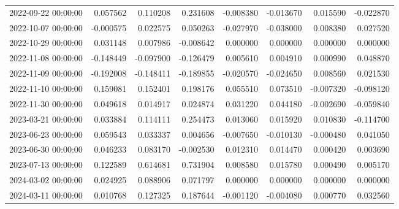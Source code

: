 \begin{tabular}{lrrrrrrr}
2022-09-22 00:00:00 & 0.057562 & 0.110208 & 0.231608 & -0.008380 & -0.013670 & 0.015590 & -0.022870 \\
2022-10-07 00:00:00 & -0.000575 & 0.022575 & 0.050263 & -0.027970 & -0.038000 & 0.008380 & 0.027520 \\
2022-10-29 00:00:00 & 0.031148 & 0.007986 & -0.008642 & 0.000000 & 0.000000 & 0.000000 & 0.000000 \\
2022-11-08 00:00:00 & -0.148449 & -0.097900 & -0.126479 & 0.005610 & 0.004910 & 0.000990 & 0.048870 \\
2022-11-09 00:00:00 & -0.192008 & -0.148411 & -0.189855 & -0.020570 & -0.024650 & 0.008560 & 0.021530 \\
2022-11-10 00:00:00 & 0.159081 & 0.152401 & 0.198176 & 0.055510 & 0.073510 & -0.007320 & -0.098120 \\
2022-11-30 00:00:00 & 0.049618 & 0.014917 & 0.024874 & 0.031220 & 0.044180 & -0.002690 & -0.059840 \\
2023-03-21 00:00:00 & 0.033884 & 0.114111 & 0.254473 & 0.013060 & 0.015920 & 0.010830 & -0.114700 \\
2023-06-23 00:00:00 & 0.059543 & 0.033337 & 0.004656 & -0.007650 & -0.010130 & -0.000480 & 0.041050 \\
2023-06-30 00:00:00 & 0.046233 & 0.083170 & -0.002530 & 0.012310 & 0.014470 & 0.000420 & 0.003690 \\
2023-07-13 00:00:00 & 0.122589 & 0.614681 & 0.731904 & 0.008580 & 0.015780 & 0.000490 & 0.005170 \\
2024-03-02 00:00:00 & 0.024925 & 0.088906 & 0.071797 & 0.000000 & 0.000000 & 0.000000 & 0.000000 \\
2024-03-11 00:00:00 & 0.010768 & 0.127325 & 0.187644 & -0.001120 & -0.004080 & 0.000770 & 0.032560 \\
\bottomrule
\end{tabular}
